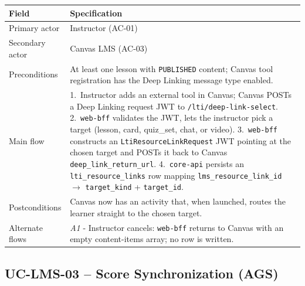 \begin{longtable}{|p{3.2cm}|p{10.3cm}|}
\hline
\textbf{Field} & \textbf{Specification} \\
\hline
\endhead
Primary actor & Instructor (AC-01) \\
\hline
Secondary actor & Canvas LMS (AC-03) \\
\hline
Preconditions & At least one lesson with \texttt{PUBLISHED} content;
    Canvas tool registration has the Deep Linking message type
    enabled. \\
\hline
Main flow &
    1.\ Instructor adds an external tool in Canvas; Canvas POSTs a
    Deep Linking request JWT to \texttt{/lti/deep-link-select}.
    2.\ \texttt{web-bff} validates the JWT, lets the instructor pick a
    target (lesson, card, quiz\_set, chat, or video).
    3.\ \texttt{web-bff} constructs an
    \texttt{LtiResourceLinkRequest} JWT pointing at the chosen target
    and POSTs it back to Canvas \texttt{deep\_link\_return\_url}.
    4.\ \texttt{core-api} persists an \texttt{lti\_resource\_links}
    row mapping \texttt{lms\_resource\_link\_id} $\to$
    \texttt{target\_kind} + \texttt{target\_id}. \\
\hline
Postconditions & Canvas now has an activity that, when launched,
    routes the learner straight to the chosen target. \\
\hline
Alternate flows &
    \emph{A1} - Instructor cancels: \texttt{web-bff} returns to
    Canvas with an empty content-items array; no row is written. \\
\hline
\end{longtable}

\subsection{UC-LMS-03 -- Score Synchronization (AGS)}

